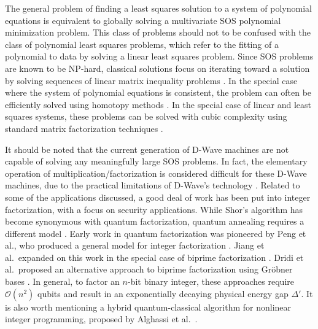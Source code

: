The general problem of finding a least squares solution to a system of polynomial equations is equivalent to globally solving a multivariate SOS polynomial minimization problem.
This class of problems should not to be confused with the class of polynomial least squares problems, which refer to the fitting of a polynomial to data by solving a linear least squares problem.
Since SOS problems are known to be NP-hard, classical solutions focus on iterating toward a solution by solving sequences of linear matrix inequality problems \cite{lasserre2001global}.
In the special case where the system of polynomial equations is consistent, the problem can often be efficiently solved using homotopy methods \cite{watson1997algorithm}.
In the special case of linear and least squares systems, these problems can be solved with cubic complexity using standard matrix factorization techniques \cite{golub2012matrix}.

It should be noted that the current generation of D-Wave machines are not capable of solving any meaningfully large SOS problems.
In fact, the elementary operation of multiplication/factorization is considered difficult for these D-Wave machines, due to the practical limitations of D-Wave's technology \cite{andriyash2016boosting}.
Related to some of the applications discussed, a good deal of work has been put into integer factorization, with a focus on security applications.
While Shor's algorithm has become synonymous with quantum factorization, quantum annealing requires a different model \cite{shor1999polynomial}.
Early work in quantum factorization was pioneered by Peng et al., who produced a general model for integer factorization \cite{peng2008quantum}.
Jiang et al.\ expanded on this work in the special case of biprime factorization \cite{jiang2018quantum}.
Dridi et al.\ proposed an alternative approach to biprime factorization using Gr\"{o}bner bases \cite{dridi2017prime}.
In general, to factor an $n$-bit binary integer, these approaches require $\mathcal{O}(n^2)$ qubits and result in an exponentially decaying physical energy gap $\Delta'$.
It is also worth mentioning a hybrid quantum-classical algorithm for nonlinear integer programming, proposed by Alghassi et al.\ \cite{alghassi2019graver}.

